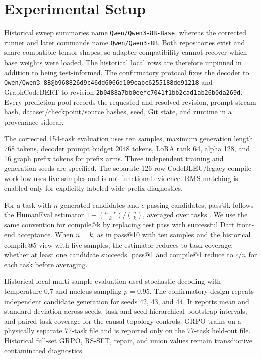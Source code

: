 \documentclass[11pt]{article}
\begin{document}
\section{Experimental Setup}

Historical sweep summaries name \texttt{Qwen/Qwen3-8B-Base}, whereas the corrected runner and later commands name \texttt{Qwen/Qwen3-8B}. Both repositories exist and share compatible tensor shapes, so adapter compatibility cannot recover which base weights were loaded. The historical local rows are therefore unpinned in addition to being test-informed. The confirmatory protocol fixes the decoder to \texttt{Qwen/Qwen3-8B@b968826d9c46dd6066d109eabc6255188de91218} and GraphCodeBERT to revision \texttt{2b0488a7bb0eefc7041f1bb2cad1ab26b0da269d}. Every prediction pool records the requested and resolved revision, prompt-stream hash, dataset/checkpoint/source hashes, seed, Git state, and runtime in a provenance sidecar.

The corrected 154-task evaluation uses ten samples, maximum generation length 768 tokens, decoder prompt budget 2048 tokens, LoRA rank 64, alpha 128, and 16 graph prefix tokens for prefix arms. Three independent training and generation seeds are specified. The separate 126-row CodeBLEU/legacy-compile workflow uses five samples and is not functional evidence. RMS matching is enabled only for explicitly labeled wide-prefix diagnostics.

For a task with \(n\) generated candidates and \(c\) passing candidates, pass@k follows the HumanEval estimator \(1 - \binom{n-c}{k}/\binom{n}{k}\), averaged over tasks \cite{chen2021codex}. We use the same convention for compile@k by replacing test pass with successful Dart front-end acceptance. When \(n=k\), as in pass@10 with ten samples and the historical compile@5 view with five samples, the estimator reduces to task coverage: whether at least one candidate succeeds. pass@1 and compile@1 reduce to \(c/n\) for each task before averaging.

Historical local multi-sample evaluation used stochastic decoding with temperature 0.7 and nucleus sampling \(p=0.95\). The confirmatory design repeats independent candidate generation for seeds 42, 43, and 44. It reports mean and standard deviation across seeds, task-and-seed hierarchical bootstrap intervals, and paired task coverage for the causal topology controls. GRPO trains on a physically separate 77-task file and is reported only on the 77-task held-out file. Historical full-set GRPO, RS-SFT, repair, and union values remain transductive contaminated diagnostics.
\end{document}
